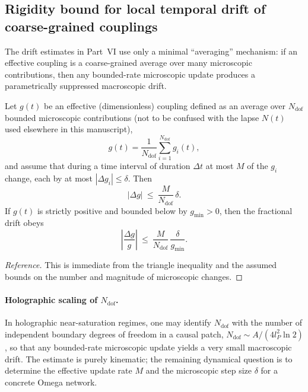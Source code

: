 \subsection{Rigidity bound for local temporal drift of coarse-grained couplings}
\label{app:rigidity_drift}
The drift estimates in Part~VI use only a minimal ``averaging'' mechanism: if an effective coupling is a coarse-grained average over many microscopic contributions, then any bounded-rate microscopic update produces a parametrically suppressed macroscopic drift.

\begin{proposition}
\label{prop:averaging_bound}
Let $g(t)$ be an effective (dimensionless) coupling defined as an average over $N_{\mathrm{dof}}$ bounded microscopic contributions (not to be confused with the lapse $N(t)$ used elsewhere in this manuscript),
\begin{equation}
    g(t)=\frac{1}{N_{\mathrm{dof}}}\sum_{i=1}^{N_{\mathrm{dof}}} g_i(t),
\end{equation}
and assume that during a time interval of duration $\Delta t$ at most $M$ of the $g_i$ change, each by at most $|\Delta g_i|\le \delta$. Then
\begin{equation}
    |\Delta g|\ \le\ \frac{M}{N_{\mathrm{dof}}}\,\delta.
\end{equation}
If $g(t)$ is strictly positive and bounded below by $g_{\min}>0$, then the fractional drift obeys
\begin{equation}
    \left|\frac{\Delta g}{g}\right|\ \le\ \frac{M}{N_{\mathrm{dof}}}\,\frac{\delta}{g_{\min}}.
\end{equation}
\end{proposition}
\begin{proof}[Reference]
This is immediate from the triangle inequality and the assumed bounds on the number and magnitude of microscopic changes.
\end{proof}

\paragraph{Holographic scaling of $N_{\mathrm{dof}}$.}
In holographic near-saturation regimes, one may identify $N_{\mathrm{dof}}$ with the number of independent boundary degrees of freedom in a causal patch, $N_{\mathrm{dof}}\sim A/(4l_P^2\ln 2)$, so that any bounded-rate microscopic update yields a very small macroscopic drift. The estimate is purely kinematic; the remaining dynamical question is to determine the effective update rate $M$ and the microscopic step size $\delta$ for a concrete Omega network.

